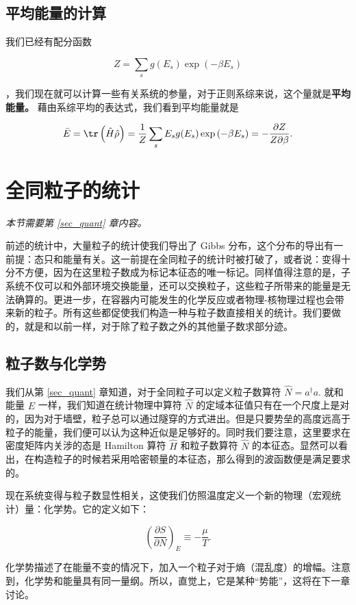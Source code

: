 \subsection{平均能量的计算}
我们已经有配分函数 \begin{linenomath}\begin{equation}Z=\sum_{s} g(E_s)\exp\left( -\beta{E_s} \right)\end{equation}\end{linenomath}，我们现在就可以计算一些有关系统的参量，对于正则系综来说，这个量就是\textbf{平均能量。}
藉由系综平均的表达式，我们看到平均能量就是 \begin{linenomath}\begin{equation}\bar{E} = \tr\left( \hat H\hat \rho \right) = \frac{1}{Z}\sum_{s} E_sg(E_s)\exp\left( -\beta{E_s} \right) = -\frac{\partial Z}{Z\partial \beta}.\end{equation}\end{linenomath}

\section{全同粒子的统计}
{\noindent \textit{本节需要第 \ref{sec_quant} 章内容。}}

前述的统计中，大量粒子的统计使我们导出了 Gibbs 分布，这个分布的导出有一前提：态只和能量有关。这一前提在全同粒子的统计时被打破了，或者说：变得十分不方便，因为在这里粒子数成为标记本征态的唯一标记。同样值得注意的是，子系统不仅可以和外部环境交换能量，还可以交换粒子，这些粒子所带来的能量是无法确算的。更进一步，在容器内可能发生的化学反应或者物理-核物理过程也会带来新的粒子。所有这些都促使我们构造一种与粒子数直接相关的统计。我们要做的，就是和以前一样，对于除了粒子数之外的其他量子数求部分迹。
\subsection{粒子数与化学势}
我们从第 \ref{sec_quant} 章知道，对于全同粒子可以定义粒子数算符 $\hat{N} = a^\dagger a.$ 就和能量 $E$ 一样，我们知道在统计物理中算符 $\hat{N}$ 的定域本征值只有在一个尺度上是对的，因为对于墙壁，粒子总可以通过隧穿的方式进出。但是只要势垒的高度远高于粒子的能量，我们便可以认为这种近似是足够好的。同时我们要注意，这里要求在密度矩阵内关涉的态是 Hamilton 算符 $\hat H$ 和粒子数算符 $\hat N$ 的本征态。显然可以看出，在构造粒子的时候若采用哈密顿量的本征态，那么得到的波函数便是满足要求的。

现在系统变得与粒子数显性相关，这使我们仿照温度定义一个新的物理（宏观统计）量：化学势。它的定义如下：
\begin{linenomath}\begin{equation}\left( \frac{\partial S}{\partial N} \right)_E \equiv -\frac{\mu}{T}.\end{equation}\end{linenomath}
化学势描述了在能量不变的情况下，加入一个粒子对于熵（混乱度）的增幅。注意到，化学势和能量具有同一量纲。所以，直觉上，它是某种“势能”，这将在下一章讨论。

